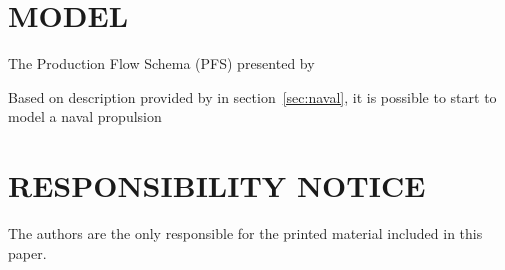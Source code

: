 \documentclass[10pt,fleqn,a4paper,twoside]{article}
\begin{document}
	\section{MODEL}
	\label{sec:model}
	The Production Flow Schema (PFS) presented by \citet{Miyagi1996}\space
	
	Based on description provided by in section~\ref{sec:naval}\space, it is possible to start to model a naval propulsion
	
	
	
	\renewcommand{\refname}{}
	
	
	\section{RESPONSIBILITY NOTICE}
	\label{sec:legal}
	
	The authors are the only responsible for the printed material included in this paper.
	
\end{document}
